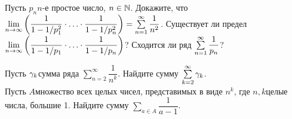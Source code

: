 \documentclass[a4paper,12pt]{article}
\begin{document}
Пусть $p_n$\т $n$-е простое число, $n\in\mathbb{N}$.
Докажите, что $\lim\limits_{n \rightarrow \infty}\left(\dfrac1{1-1/p_1^2}\cdot\ldots\cdot\dfrac1{1-1/p_n^2}\right)=
\sum\limits_{n=1}^{\infty} \dfrac1{n^2}$.
Существует ли предел $\lim\limits_{n \rightarrow \infty}\left(\dfrac1{1-1/p_1}\cdot\ldots\cdot\dfrac1{1-1/p_n}\right)$?
Сходится ли ряд $\sum\limits_{n=1}^{\infty} \dfrac1{p_n}$?


Пусть $\gamma_k$\т сумма ряда $\sum\limits_{n=2}^{\infty}\dfrac1{n^k}$. Найдите сумму $\sum\limits_{k=2}^{\infty}\gamma_k$.\\
Пусть $A$\т множество всех целых чисел, представимых в виде $n^k$, где $n,k$\т целые числа, большие 1. Найдите сумму $\sum\limits_{a\in A}\dfrac1{a-1}$.

{}
\end{document}
